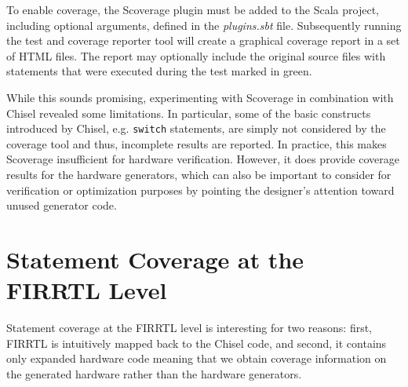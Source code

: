 \documentclass[conference]{IEEEtran}
\begin{document}
To enable coverage, the Scoverage plugin must be added to the Scala project, including optional arguments, defined in the \textit{plugins.sbt} file. 
Subsequently running the test and coverage reporter tool will create a graphical coverage report in a set of HTML files. The report may optionally include the original source files with statements that were executed during the test marked in green. %

While this sounds promising, experimenting with Scoverage in combination with Chisel revealed some limitations. In particular, some of the basic constructs introduced by Chisel, e.g. \texttt{switch} statements, are simply not considered by the coverage tool and thus, incomplete results are reported. In practice, this makes Scoverage insufficient for hardware verification. However, it does provide coverage results for the hardware generators, which can also be important to consider for verification or optimization purposes by pointing the designer's attention toward unused generator code.

\section{Statement Coverage at the FIRRTL Level}  
Statement coverage at the FIRRTL level is interesting for two reasons: first, FIRRTL is intuitively mapped back to the Chisel code, and second, it contains only expanded hardware code meaning that we obtain coverage information on the generated hardware rather than the hardware generators.%
\end{document}
